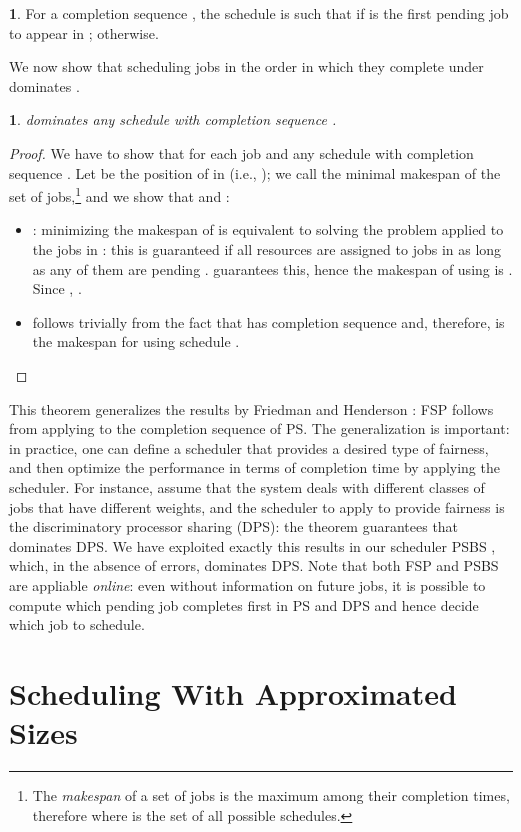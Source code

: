 \documentclass[11pt,oneside,english]{amsart}
\numberwithin{equation}{section}
\numberwithin{figure}{section}
\theoremstyle{definition}
\newtheorem{defn}{\protect\definitionname}
\theoremstyle{plain}
\newtheorem*{thm*}{\protect\theoremname}
\providecommand{\definitionname}{Definition}
\providecommand{\theoremname}{Theorem}
\begin{document}
\begin{defn}
For a completion sequence , the  schedule is
such that  if  is the first
pending job to appear in ; 
otherwise.
\end{defn}
We now show that scheduling jobs in the order in which they complete
under  dominates .
\begin{thm*}
 dominates any schedule with completion sequence
.\end{thm*}
\begin{proof}
We have to show that  for
each job  and any schedule  with completion sequence
. Let  be the position of  in  (i.e., ); we call  the minimal makespan of the 
set of jobs,\footnote{The \emph{makespan} of a set of jobs is the maximum among their completion
times, therefore 
where  is the set of all possible schedules.} and we show that  and :
\begin{itemize}
\item : minimizing the makespan of 
is equivalent to solving the  problem applied
to the jobs in : this is guaranteed if all resources
are assigned to jobs in  as long as any of them are pending
\cite{Liu1973}.  guarantees this, hence the makespan
of  using  is . Since ,
.
\item  follows trivially from the fact that 
has completion sequence  and, therefore,  is the
makespan for  using schedule .
\qedhere
\end{itemize}
\end{proof}
This theorem generalizes the results by Friedman and Henderson
 \cite{Friedman2003}: FSP follows from applying 
to the completion sequence of PS.
The generalization is important: in practice, one can define 
a scheduler that provides a desired type of fairness, and then optimize
the performance in terms of completion time by applying the 
scheduler. For instance, assume that the system deals with different 
classes of jobs that have different weights, and the scheduler to apply 
to provide fairness is the discriminatory processor sharing (DPS): the 
theorem guarantees that  dominates DPS. We have exploited
exactly this results in our scheduler PSBS \cite{DellAmico2014}, which, 
in the absence of errors, dominates DPS.
Note that both FSP and
PSBS are appliable \emph{online}: even without information on
future jobs, it is possible to compute which pending job completes
first in PS and DPS and hence decide which job to schedule.


\section{\label{sec:Scheduling-With-Uncertain}Scheduling With Approximated
Sizes}
\end{document}
